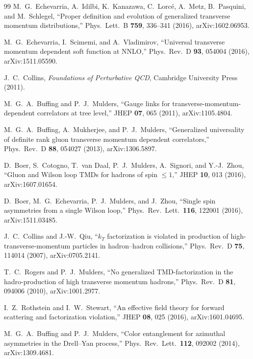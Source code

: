 \documentclass[11pt]{article}
\begin{document}
\begin{thebibliography}{99}
M.~G.~Echevarria, A.~Idilbi, K.~Kanazawa, C.~Lorc\'e, A.~Metz,
B.~Pasquini, and M.~Schlegel,
``Proper definition and evolution of generalized transverse momentum
distributions,''
Phys.\ Lett.\ B \textbf{759}, 336--341 (2016), arXiv:1602.06953.

M.~G.~Echevarria, I.~Scimemi, and A.~Vladimirov,
``Universal transverse momentum dependent soft function at NNLO,''
Phys.\ Rev.\ D \textbf{93}, 054004 (2016), arXiv:1511.05590.

J.~C.~Collins,
\emph{Foundations of Perturbative QCD},
Cambridge University Press (2011).

M.~G.~A.~Buffing and P.~J.~Mulders,
``Gauge links for transverse-momentum-dependent correlators at tree level,''
JHEP \textbf{07}, 065 (2011), arXiv:1105.4804.

M.~G.~A.~Buffing, A.~Mukherjee, and P.~J.~Mulders,
``Generalized universality of definite rank gluon transverse momentum
dependent correlators,''
Phys.\ Rev.\ D \textbf{88}, 054027 (2013), arXiv:1306.5897.

D.~Boer, S.~Cotogno, T.~van Daal, P.~J.~Mulders, A.~Signori, and Y.-J.~Zhou,
``Gluon and Wilson loop TMDs for hadrons of spin \(\leq1\),''
JHEP \textbf{10}, 013 (2016), arXiv:1607.01654.

D.~Boer, M.~G.~Echevarria, P.~J.~Mulders, and J.~Zhou,
``Single spin asymmetries from a single Wilson loop,''
Phys.\ Rev.\ Lett.\ \textbf{116}, 122001 (2016), arXiv:1511.03485.

J.~C.~Collins and J.-W.~Qiu,
``\(k_T\) factorization is violated in production of high-transverse-momentum
particles in hadron--hadron collisions,''
Phys.\ Rev.\ D \textbf{75}, 114014 (2007), arXiv:0705.2141.

T.~C.~Rogers and P.~J.~Mulders,
``No generalized TMD-factorization in the hadro-production of high transverse
momentum hadrons,''
Phys.\ Rev.\ D \textbf{81}, 094006 (2010), arXiv:1001.2977.

I.~Z.~Rothstein and I.~W.~Stewart,
``An effective field theory for forward scattering and factorization
violation,''
JHEP \textbf{08}, 025 (2016), arXiv:1601.04695.

M.~G.~A.~Buffing and P.~J.~Mulders,
``Color entanglement for azimuthal asymmetries in the Drell--Yan process,''
Phys.\ Rev.\ Lett.\ \textbf{112}, 092002 (2014), arXiv:1309.4681.


\end{thebibliography}
\end{document}

